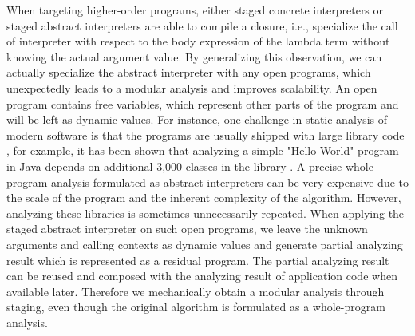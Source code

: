
\iffalse
When staging a concrete interpreter, the programmers need to distinguish static
and dynamic values --- the given program to be executed by the interpreter is
classified as static because it is known at compile-time, and the inputs to that
program are dynamic. However, when staging an abstract interpreter, this
distinction does not exist anymore. Because the abstract interpreter
instantiates all the inputs as some form of abstract values, which are usually
top elements in their abstract domains and are also statically known. Then what
is the point of staging if there is no such distinction? A surprising by-product
of thinking about this question is to realize that we can apply the staged
abstract interpreter on \textit{open} programs, and the free variables
representing other parts of the program (e.g., libraries) are dynamic inputs,
therefore we obtain a modular analysis through staging, mechanically.
\note{TR: I don't understand this. The program structure is static, the abstract values
are still dynamic, no? They change in every iteration of the fixpoint algorithm}
\note{TR: why is it a big deal. On Closed programs we obtain a constant factor,
but modular analysis has different asymptotics}
\fi

When targeting higher-order programs, either staged concrete interpreters or
staged abstract interpreters are able to compile a closure, i.e., specialize the
call of interpreter with respect to the body expression of the lambda term
without knowing the actual argument value. By generalizing this observation, we
can actually specialize the abstract interpreter with any open programs, which
unexpectedly leads to a modular analysis and improves scalability. An open
program contains free variables, which represent other parts of the program and
will be left as dynamic values. For instance, one challenge in static analysis
of modern software is that the programs are usually shipped with large library
code \cite{toman_et_al:LIPIcs:2017:7121}, for example, it has been shown that
analyzing a simple "Hello World" program in Java depends on additional 3,000
classes in the library \cite{DBLP:conf/oopsla/KulkarniMZN16}. A precise
whole-program analysis formulated as abstract interpreters can be very expensive
due to the scale of the program and the inherent complexity of the algorithm.
However, analyzing these libraries is sometimes unnecessarily repeated. When
applying the staged abstract interpreter on such open programs, we leave the
unknown arguments and calling contexts as dynamic values and generate partial
analyzing result which is represented as a residual program. The partial
analyzing result can be reused and composed with the analyzing result of
application code when available later. Therefore we mechanically obtain a
modular analysis through staging, even though the original algorithm is
formulated as a whole-program analysis.

